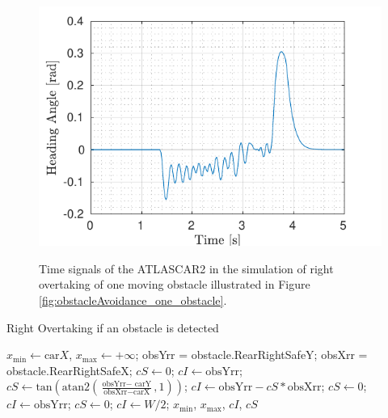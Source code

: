 \begin{figure}[!t]
\begin{minipage}[t]{0.5\textwidth}
		\subcaption{}\label{fig:delta_one_moving}
	\end{minipage}
	\begin{minipage}[t]{0.5\textwidth}
		\includegraphics[width=\textwidth]{../../MATLAB/one_obstacle_right_overtaking/figure/HeadingAngleVsTime.pdf}
		\subcaption{}\label{fig:theta_one_moving}
	\end{minipage}
	\caption{Time signals of the ATLASCAR2 in the simulation of right overtaking of one moving obstacle illustrated in Figure \ref{fig:obstacleAvoidance_one_obstacle}.}
	\label{fig:components_one_moving_obstacle}
\end{figure}

\begin{algorithm}%
	\caption{Right Overtaking if an obstacle is detected}
	\small
	\begin{algorithmic}[1]
		\State $x_\text{min} \gets \text{car}X $,  $x_\text{max} \gets +\infty$;
		\State obsYrr = obstacle.RearRightSafeY;
		\State obsXrr = obstacle.RearRightSafeX;
		\State $cS \gets 0$; $cI \gets \text{obsYrr}$;
		\Else
		\State $cS \gets \text{tan}(\text{atan2}(\frac{\text{obsYrr}-\text{ carY}}{\text{obsXrr}-\text{carX}},1))$;
		\State $cI \gets \text{obsYrr}-cS*\text{obsXrr}$;
		\EndIf
		\Else
		\State $cS \gets 0$; $cI \gets \text{obsYrr}$;
		\Else
		\State $cS \gets 0$; $cI \gets W/2$;
		\EndIf
		\EndIf
		\State \Return $x_\text{min}$, $x_\text{max}$, $cI$, $cS$
		\EndFunction
	\end{algorithmic}
	\label{alg:rightOvertaking}
\end{algorithm}

